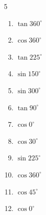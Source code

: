 \begin{multicols}{5}
\begin{enumerate}

  \item $\displaystyle \tan{360^\circ}$

        \phantom{$\displaystyle =0$}

  \item $\displaystyle \cos{360^\circ}$

        \phantom{$\displaystyle =1$}

  \item $\displaystyle \tan{225^\circ}$

        \phantom{$\displaystyle =1$}

  \item $\displaystyle \sin{150^\circ}$


  \item $\displaystyle \sin{300^\circ}$


  \item $\displaystyle \tan{90^\circ}$

        \phantom{$\displaystyle なし$}

  \item $\displaystyle \cos{0^\circ}$

        \phantom{$\displaystyle =1$}

  \item $\displaystyle \cos{30^\circ}$


  \item $\displaystyle \sin{225^\circ}$


  \item $\displaystyle \cos{360^\circ}$

        \phantom{$\displaystyle =1$}

  \item $\displaystyle \cos{45^\circ}$


  \item $\displaystyle \cos{0^\circ}$

        \phantom{$\displaystyle =1$}

\columnbreak %


\end{enumerate}
\end{multicols}
